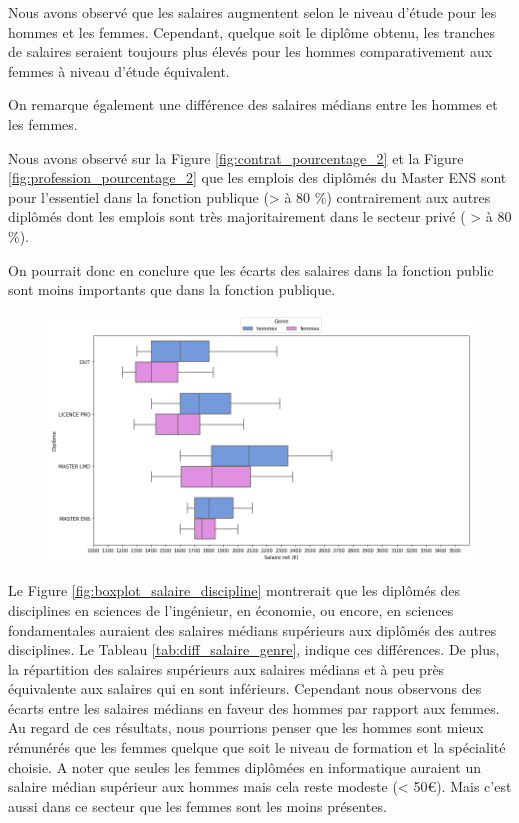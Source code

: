 \documentclass[12pt, a4paper, titlepage, table]{article}
\begin{document}
	Nous avons observé que les salaires augmentent selon le niveau d'étude pour les hommes et les femmes. Cependant, quelque soit le diplôme obtenu, les tranches de salaires seraient toujours plus élevés pour les hommes comparativement aux femmes à niveau d'étude équivalent.
	
	On remarque également une différence des salaires médians entre les hommes et les femmes. 
	
	Nous avons observé sur la Figure \ref{fig:contrat_pourcentage_2} et la Figure \ref{fig:profession_pourcentage_2} que les emplois des diplômés du Master ENS sont pour l'essentiel dans la fonction publique (> à 80 \%) contrairement aux autres diplômés dont les emplois sont très majoritairement dans le secteur privé ( >  à 80 \%).
	
	On pourrait donc en conclure que les écarts des salaires dans la fonction public sont moins importants que dans la fonction publique.
	

	\begin{figure}[H]
		\centering
		\includegraphics[width=1\textwidth]{../graphs/boxplot_diplomes_genre.png}
		\label{fig:boxplot_diplome_genre}
	\end{figure}

	Le Figure \ref{fig:boxplot_salaire_discipline} montrerait que les diplômés des disciplines en sciences de l'ingénieur, en économie, ou encore, en sciences fondamentales auraient des salaires médians supérieurs aux diplômés des autres disciplines. Le Tableau \ref{tab:diff_salaire_genre}, indique ces différences. De plus, la répartition des salaires supérieurs aux salaires médians et à peu près équivalente aux salaires qui en sont inférieurs. Cependant nous observons des écarts entre les salaires médians en faveur des hommes par rapport aux femmes.
	Au regard de ces résultats, nous pourrions penser que les hommes sont mieux rémunérés que les femmes quelque que soit le niveau de formation et la spécialité choisie. A noter que seules les femmes diplômées en informatique auraient un salaire médian supérieur aux hommes mais cela reste modeste (< 50€). Mais c'est aussi dans ce secteur que les femmes sont les moins présentes.
	
\end{document}
